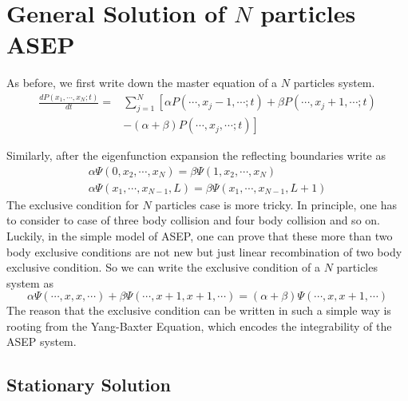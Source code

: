 \documentclass[12pt,a4paper]{article}
\begin{document}
\section{General Solution of $N$ particles ASEP}
\label{sec:general_solution_of_n_particles_asep}

As before, we first write down the master equation of a $N$ particles system.
\begin{equation}
    \begin{aligned}
        \label{eq:masterEqN}
        \frac{d P(x_1, \cdots, x_N; t)}{dt} = & \sum_{j=1}^N \left[\alpha
            P(\cdots,x_j-1,\cdots;t) + \beta P(\cdots, x_j+1, \cdots;t)\right. \\ 
        & \left.- (\alpha+\beta)P(\cdots, x_j, \cdots; t)\right]
    \end{aligned}
\end{equation}

Similarly, after the eigenfunction expansion the reflecting boundaries write as
\begin{subequations}
    \label{eq:boundaries-N-particles}
    \begin{eqnarray}
        \alpha \Psi(0,x_2,\cdots,x_N) = \beta \Psi(1, x_2,\cdots, x_N) \\
        \alpha \Psi(x_1,\cdots, x_{N-1}, L) = \beta \Psi(x_1,\cdots, x_{N-1}, L+1)
    \end{eqnarray}
\end{subequations}
The exclusive condition for $N$ particles case is more tricky. In principle,
one has to consider to case of three body collision and four body collision and
so on. Luckily, in the simple model of ASEP, one can prove that these more than
two body exclusive conditions are not new but just linear recombination of two
body exclusive condition. So we can write the exclusive condition of a $N$
particles system as 
\begin{equation}
    \label{eq:exclusionConditionN}
    \alpha \Psi(\cdots,x, x,\cdots) + \beta \Psi(\cdots, x+1, x+1, \cdots) 
    = (\alpha + \beta) \Psi(\cdots, x, x+1, \cdots)
\end{equation}
The reason that the exclusive condition can be written in such a simple way is
rooting from the Yang-Baxter Equation, which encodes the integrability of the
ASEP system.

\subsection{Stationary Solution}
\label{sub:stationary_solution}
\end{document}
